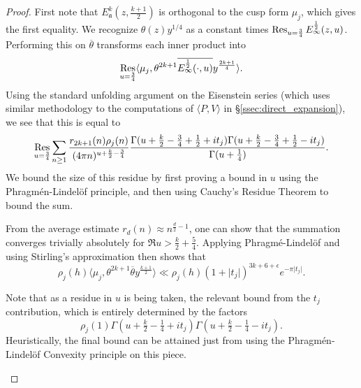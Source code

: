 \begin{proof}
  First note that $E^k_\mathfrak{a}(z, \tfrac{k+1}{2})$ is orthogonal to the cusp form
  $\mu_j$, which gives the first equality.
  We recognize $\theta(z) y^{1/4}$ as a constant times $\operatorname*{Res}_{u = \frac{3}{4}}
  E_\infty^{\frac{1}{2}}(z,u)$.
  Performing this on $\overline{\theta}$ transforms each inner product into
  \begin{equation}
    \operatorname*{Res}_{u = \frac{3}{4}} \langle \mu_j, \theta^{2k+1}
    \overline{E_\infty^{\frac{1}{2}}(\cdot,u)} y^{\frac{2k+1}{4}}\rangle.
  \end{equation}
  Using the standard unfolding argument on the Eisenstein series (which uses similar
  methodology to the computations of $\langle P, V \rangle$ in
  \S\ref{ssec:direct_expansion}), we see that this is equal to
  \begin{equation}
    \Res_{u = \frac{3}{4}}
    \sum_{n \geq 1} \frac{r_{2k+1}(n)\rho_j(n)}{(4\pi n)^{u + \frac{k}{2} - \frac{3}{4}}}
    \frac{%
      \Gamma(u + \frac{k}{2} - \frac{3}{4} + \frac{1}{2} + it_j)
      \Gamma(u + \frac{k}{2} - \frac{3}{4} + \frac{1}{2} - it_j)
    }
    {\Gamma(u + \frac{1}{4})}.
  \end{equation}
  We bound the size of this residue by first proving a bound in $u$ using
  the Phragm\'{e}n-Lindel\"{o}f principle, and then using Cauchy's Residue Theorem to
  bound the sum.

  From the average estimate $r_d(n) \approx n^{\frac{d}{2} - 1}$, one can show that
  the summation converges trivially absolutely for $\Re u > \frac{k}{2} + \tfrac{5}{4}$.
  Applying Phragm\'{e}-Lindel\"{o}f and using Stirling's approximation then shows that
  \begin{equation}
    \rho_j(h) \langle \mu_j, \theta^{2k+1} \overline{\theta} y^{\frac{k+1}{2}} \rangle
    \ll
    \rho_j(h) (1 + \lvert t_j \rvert)^{3k+6+\epsilon} e^{-\pi \lvert t_j \rvert}.
  \end{equation}


  \begin{remark}
    Note that as a residue in $u$ is being taken, the relevant bound from the $t_j$
    contribution, which is entirely determined by the factors
    \begin{equation}
      \rho_j(1)
      \Gamma(u + \tfrac{k}{2} - \tfrac{1}{4} + it_j)
      \Gamma(u + \tfrac{k}{2} - \tfrac{1}{4} - it_j).
    \end{equation}
    Heuristically, the final bound can be attained just from using the Phragm\'{e}n-Lindel\"{o}f
    Convexity principle on this piece.
  \end{remark}



\end{proof}

